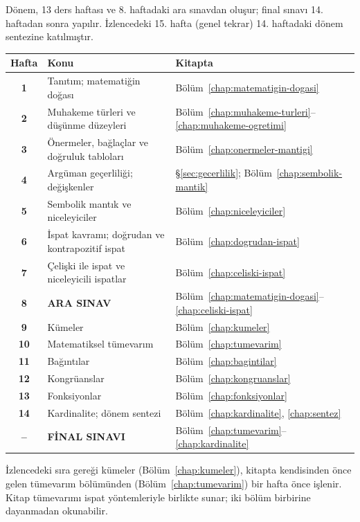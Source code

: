 \documentclass[10pt,twoside,openright]{book}
\begin{document}
Dönem, 13 ders haftası ve 8. haftadaki ara sınavdan oluşur; final sınavı 14. haftadan sonra yapılır. İzlencedeki 15. hafta (genel tekrar) 14. haftadaki dönem sentezine katılmıştır.

\begin{center}
\small
\renewcommand{\arraystretch}{1.18}
\begin{tabularx}{\textwidth}{>{\bfseries}c >{\raggedright\arraybackslash}X >{\raggedright\arraybackslash}p{2.35cm}}
\toprule
Hafta & Konu & Kitapta \\
\midrule
1 & Tanıtım; matematiğin doğası & Bölüm~\ref{chap:matematigin-dogasi} \\
2 & Muhakeme türleri ve düşünme düzeyleri & Bölüm~\ref{chap:muhakeme-turleri}--\ref{chap:muhakeme-ogretimi} \\
3 & Önermeler, bağlaçlar ve doğruluk tabloları & Bölüm~\ref{chap:onermeler-mantigi} \\
4 & Argüman geçerliliği; değişkenler & §\ref{sec:gecerlilik}; Bölüm~\ref{chap:sembolik-mantik} \\
5 & Sembolik mantık ve niceleyiciler & Bölüm~\ref{chap:niceleyiciler} \\
6 & İspat kavramı; doğrudan ve kontrapozitif ispat & Bölüm~\ref{chap:dogrudan-ispat} \\
7 & Çelişki ile ispat ve niceleyicili ispatlar & Bölüm~\ref{chap:celiski-ispat} \\
\rowcolor{cGrey} 8 & \textbf{ARA SINAV} & Bölüm~\ref{chap:matematigin-dogasi}--\ref{chap:celiski-ispat} \\
9 & Kümeler & Bölüm~\ref{chap:kumeler} \\
10 & Matematiksel tümevarım & Bölüm~\ref{chap:tumevarim} \\
11 & Bağıntılar & Bölüm~\ref{chap:bagintilar} \\
12 & Kongrüanslar & Bölüm~\ref{chap:kongruanslar} \\
13 & Fonksiyonlar & Bölüm~\ref{chap:fonksiyonlar} \\
14 & Kardinalite; dönem sentezi & Bölüm~\ref{chap:kardinalite}, \ref{chap:sentez} \\
\rowcolor{cGrey} -- & \textbf{FİNAL SINAVI} & Bölüm~\ref{chap:tumevarim}--\ref{chap:kardinalite} \\
\bottomrule
\end{tabularx}
\end{center}

\noindent İzlencedeki sıra gereği kümeler (Bölüm~\ref{chap:kumeler}), kitapta kendisinden önce gelen tümevarım bölümünden (Bölüm~\ref{chap:tumevarim}) bir hafta önce işlenir. Kitap tümevarımı ispat yöntemleriyle birlikte sunar; iki bölüm birbirine dayanmadan okunabilir.
\end{document}
